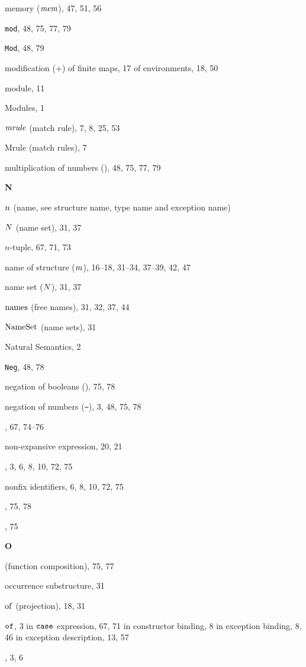 \begin{theindex}
\item memory ($\mbox{\it mem}$), 47, 51, 56
\item {\tt mod}, 48, 75, 77, 79
\item {\tt Mod}, 48, 79
\item modification ($+$) 
\subitem of finite maps, 17
\subitem of environments, 18, 50
\item module, 11
\item Modules, 1
\item ${\it mrule}$ (match rule), 7, 8, 25, 53
\item Mrule (match rules), 7
\item multiplication of numbers (\ml{*}), 48, 75, 77, 79
\indexspace
\parbox{65mm}{\hfil{\large\bf N}\hfil}
\indexspace
\item $n$ (name, see structure name, type name and exception name) 
\item $N$ (name set), 31, 37
\item $n$-tuple, 67, 71, 73
\item name 
\subitem of structure ($m$), 16--18, 31--34, 37--39, 42, 47
\item name set ($N$), 31, 37
\item $\mathop{\rm names}\nolimits$ (free names), 31, 32, 37, 44
\item ${\rm NameSet}$ (name sets), 31
\item Natural Semantics, 2
\item {\tt Neg}, 48, 78
\item negation of booleans (), 75, 78
\item negation of numbers (\verb+~+), 3, 48, 75, 78
\item \NIL, 67, 74--76
\item non-expansive expression, 20, 21
\item \NONFIX, 3, 6, 8, 10, 72, 75
\item nonfix identifiers, 6, 8, 10, 72, 75
\item {}, 75, 78
\item \NUM, 75
\indexspace
\parbox{65mm}{\hfil{\large\bf O}\hfil}
\indexspace
\item {} (function composition), 75, 77
\item occurrence 
\subitem substructure, 31
\item $ \mathbin{\rm of} $ (projection), 18, 31
\item ${\tt of}$, 3
\subitem in ${\tt case}$ expression, 67, 71
\subitem in constructor binding, 8
\subitem in exception binding, 8, 46
\subitem in exception description, 13, 57
\item \OP, 3, 6

\end{theindex}

